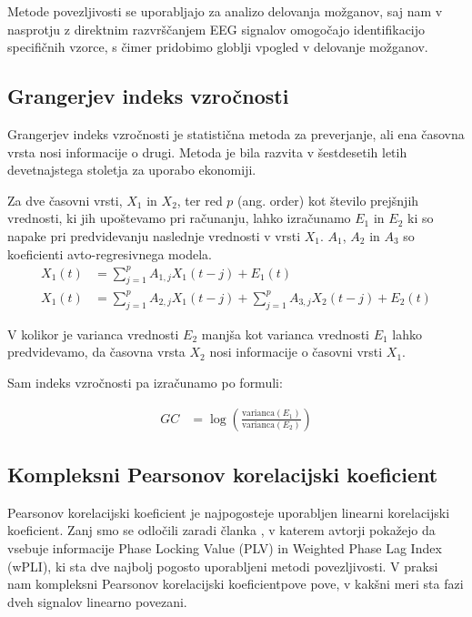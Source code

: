 Metode povezljivosti se uporabljajo za analizo delovanja možganov, saj nam v nasprotju z direktnim razvrščanjem EEG signalov omogočajo identifikacijo specifičnih vzorce, s čimer pridobimo globlji vpogled v delovanje možganov.

\subsection{Grangerjev indeks vzročnosti}
Grangerjev indeks vzročnosti je statistična metoda za preverjanje, ali ena časovna vrsta nosi informacije o drugi. Metoda je bila razvita v šestdesetih letih devetnajstega stoletja za uporabo ekonomiji. \cite{cohenAnalyzingNeuralTime2014}

Za dve časovni vrsti, $X_1$ in $X_2$, ter red $p$ (ang. order) kot število prejšnjih vrednosti, ki jih upoštevamo pri računanju, lahko izračunamo $E_1$ in $E_2$ ki so napake pri predvidevanju naslednje vrednosti v vrsti $X_1$. $A_1$, $A_2$ in $A_3$ so koeficienti avto-regresivnega modela. \cite{sethGrangerCausality2007}
\begin{align*}
X_1(t) &= \sum_{j=1}^{p} A_{1,j} X_1(t-j) + E_1(t)\\
X_1(t) &= \sum_{j=1}^{p} A_{2,j} X_1(t-j) + \sum_{j=1}^{p} A_{3,j} X_2(t-j) + E_2(t)
\end{align*}

V kolikor je varianca vrednosti $E_2$ manjša kot varianca vrednosti $E_1$ lahko predvidevamo, da časovna vrsta $X_2$ nosi informacije o časovni vrsti $X_1$.  \cite{sethGrangerCausality2007}

Sam indeks vzročnosti pa izračunamo po formuli:

\begin{align*}
GC &= \log \left( \frac{\mathrm{varianca}(E_1)}{\mathrm{varianca}(E_2)} \right)
\end{align*}

\subsection{Kompleksni Pearsonov korelacijski koeficient}
Pearsonov korelacijski koeficient je najpogosteje uporabljen linearni korelacijski koeficient. Zanj smo se odločili zaradi članka , v katerem avtorji pokažejo da vsebuje informacije Phase Locking Value (PLV) in Weighted Phase Lag Index (wPLI), ki sta dve najbolj pogosto uporabljeni metodi povezljivosti. V praksi nam kompleksni Pearsonov korelacijski koeficientpove pove, v kakšni meri sta fazi dveh signalov linearno povezani. \cite{sverkoComplexPearsonCorrelation2022} 

